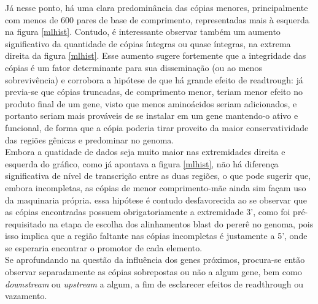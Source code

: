\documentclass[12pt]{article}
\begin{document}
\begin{multicols}{2}
Já nesse ponto, há uma clara predominância das cópias menores, principalmente com menos de 600 pares de base de comprimento, representadas mais à esquerda na figura \ref{mlhist}. Contudo, é interessante observar também um aumento significativo da quantidade de cópias íntegras ou quase íntegras, na extrema direita da figura \ref{mlhist}. Esse aumento sugere fortemente que a integridade das cópias é um fator determinante para sua disseminação (ou ao menos sobrevivência) e corrobora a hipótese de que há grande efeito de readtrough: já previa-se que cópias truncadas, de comprimento menor, teriam menor efeito no produto final de um gene, visto que menos aminoácidos seriam adicionados, e portanto seriam mais prováveis de se instalar em um gene mantendo-o ativo e funcional, de forma que a cópia poderia tirar proveito da maior conservatividade das regiões gênicas e predominar no genoma.\\

% 

Embora a quatidade de dados seja muito maior nas extremidades direita e esquerda do gráfico, como já apontava a figura \ref{mlhist}, não há diferença significativa de nível de transcrição entre as duas regiões, o que pode sugerir que, embora incompletas, as cópias de menor comprimento-mãe ainda sim façam uso da maquinaria própria. essa hipótese é contudo desfavorecida ao se observar que as cópias encontradas possuem obrigatoriamente a extremidade 3', como foi pré-requisitado na etapa de escolha dos alinhamentos blast do pererê no genoma, pois isso implica que a região faltante nas cópias incompletas é justamente a 5', onde se esperaria encontrar o promotor de cada elemento.\\

Se aprofundando na questão da influência dos genes próximos, procura-se então observar separadamente as cópias sobrepostas ou não a algum gene, bem como \textit{downstream} ou \textit{upstream} a algum, a fim de esclarecer efeitos de readthrough ou vazamento.



\end{multicols}
\end{document}

